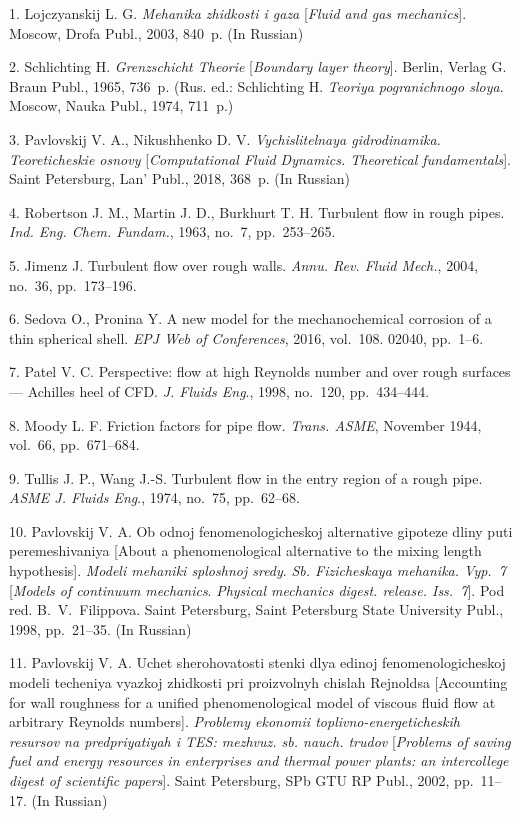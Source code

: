 \vskip 2mm

{\footnotesize

1. Lojczyanskij L. G. \emph{Mehanika zhidkosti i gaza}
[\emph{Fluid and gas mechanics}]. Moscow, Drofa Publ., 2003,
840~p. (In Russian)

2. Schlichting H. \emph{Grenzschicht Theorie} [\emph{Boundary
layer theory}]. Berlin, Verlag G. Braun Publ., 1965, 736~p. (Rus.
ed.: Schlichting H. \emph{Teoriya pogranichnogo sloya}. Moscow,
Nauka Publ., 1974, 711~p.)

3. Pavlovskij V. A., Nikushhenko D. V. \emph{Vychislitelnaya
gidrodinamika. Teoreticheskie osnovy} [\emph{Computational Fluid
Dynamics. Theoretical fundamentals}]. Saint Petersburg, Lan'
Publ., 2018, 368~p. (In Russian)

4. Robertson J. M., Martin J. D., Burkhurt T. H. Turbulent flow in
rough pipes. \emph{Ind. Eng. Chem. Fundam.}, 1963, no.~7,
pp.~253--265.

5. Jimenz J. Turbulent flow over rough walls. \emph{Annu. Rev.
Fluid Mech.}, 2004, no.~36, pp.~173--196.

6. Sedova O., Pronina Y. A new model for the mechanochemical
corrosion of a thin spherical shell. \emph{EPJ Web of
Conferences}, 2016, vol.~108. 02040, pp.~1--6.

7. Patel V. C. Perspective: flow at high Reynolds number and over
rough surfaces --- Achilles heel of CFD. \emph{J. Fluids Eng}.,
1998, no.~120, pp.~434--444.

8. Moody L. F. Friction factors for pipe flow. \emph{Trans. ASME},
November 1944, vol.~66, pp.~671--684.

9. Tullis J. P., Wang J.-S. Turbulent flow in the entry region of
a rough pipe. \emph{ASME J. Fluids Eng}., 1974, no.~75,
pp.~62--68.

10. Pavlovskij V. A. Ob odnoj fenomenologicheskoj alternative
gipoteze dliny puti peremeshivaniya [About a phenomenological
alternative to the mixing length hypothesis]. \emph{Modeli
mehaniki sploshnoj sredy}. \emph{Sb. Fizicheskaya mehanika.
Vyp.~7} [\emph{Models of continuum mechanics}. \emph{Physical
mechanics digest. release. Iss.~7}]. Pod red. B.~V.~Filippova.
Saint Petersburg, Saint Petersburg State University Publ., 1998,
pp.~21--35. (In Russian)

11. Pavlovskij V. A. Uchet sherohovatosti stenki dlya edinoj
fenomenologicheskoj modeli techeniya vyazkoj zhidkosti pri
proizvolnyh chislah Rejnoldsa [Accounting for wall roughness for a
unified phenomenological model of viscous fluid flow at arbitrary
Reynolds numbers].     \emph{Problemy ekonomii
toplivno-energeticheskih resursov na predpriyatiyah i TES:
mezhvuz. sb. nauch. trudov} [\emph{Problems of saving fuel and
energy resources in enterprises and thermal power plants: an
intercollege digest of scientific papers}]. Saint Petersburg, SPb
GTU RP Publ., 2002, pp.~11--17. (In Russian)

}
